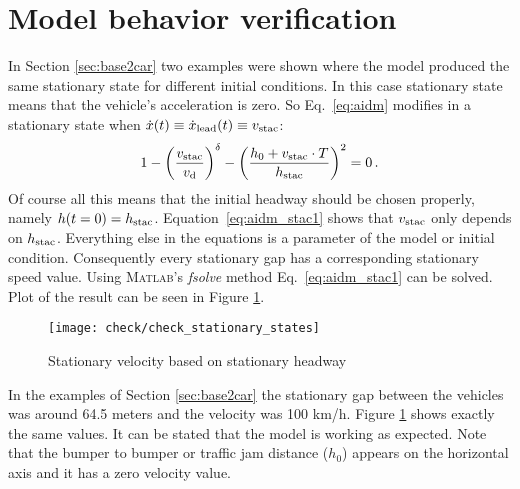 	\section{Model behavior verification}
		In Section \ref{sec:base2car} two examples were shown where the model produced the same stationary state for different initial conditions. In this case stationary state means that the vehicle's acceleration is zero. So Eq.~\eqref{eq:aidm} modifies in a stationary state when $\dot{x}(t)\equiv \dot{x}_{\rm lead}(t)\equiv v_{\rm stac}$:
		\begin{equation}
		1 - \left ( \frac{v_{\rm stac}}{v_{\rm d}} \right )^{\rm \delta} - \left ( \frac{h_0+v_{\rm stac}\cdot T}{h_{\rm stac}} \right )^2=0\,.
		\label{eq:aidm_stac1}
		\end{equation}
		Of course all this means that the initial headway should be chosen properly, namely $h(t=0)=h_{\rm stac}$.
		Equation~\eqref{eq:aidm_stac1} shows that $v_{\rm stac}$ only depends on $h_{\rm stac}$. Everything else in the equations is a parameter of the model or initial condition. Consequently every stationary gap has a corresponding stationary speed value. Using \textsc{Matlab}'s \textit{fsolve} method Eq.~\eqref{eq:aidm_stac1} can be solved. Plot of the result can be seen in Figure \ref{fig:aidm_stac}.
		\begin{figure}
			\centering
			\texttt{[image: check/check\_stationary\_states]}
			\caption{Stationary velocity based on stationary headway}
			\label{fig:aidm_stac}
		\end{figure}

		In the examples of Section \ref{sec:base2car} the stationary gap between the vehicles was around 64.5 meters and the velocity was 100 km/h. Figure \ref{fig:aidm_stac} shows exactly the same values. It can be stated that the model is working as expected. Note that the bumper to bumper or traffic jam distance ($h_0$) appears on the horizontal axis and it has a zero velocity value.
